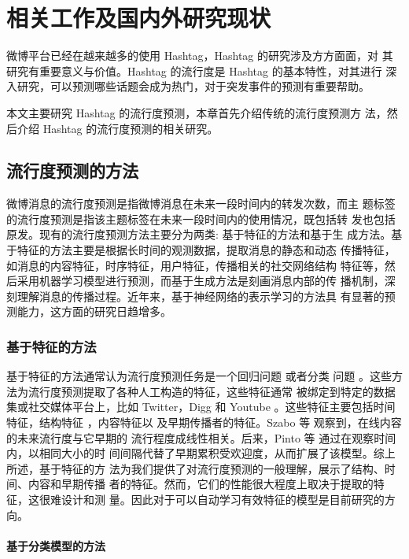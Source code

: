 \chapter{相关工作及国内外研究现状}\label{chap:two}
微博平台已经在越来越多的使用 Hashtag，Hashtag 的研究涉及方方面面，对 其研究有重要意义与价值。Hashtag 的流行度是 Hashtag 的基本特性，对其进行 深入研究，可以预测哪些话题会成为热门，对于突发事件的预测有重要帮助。

本文主要研究 Hashtag 的流行度预测，本章首先介绍传统的流行度预测方 法，然后介绍 Hashtag 的流行度预测的相关研究。

\section{流行度预测的方法}
微博消息的流行度预测是指微博消息在未来一段时间内的转发次数，而主 题标签的流行度预测是指该主题标签在未来一段时间内的使用情况，既包括转 发也包括原发。现有的流行度预测方法主要分为两类: 基于特征的方法和基于生 成方法。基于特征的方法主要是根据长时间的观测数据，提取消息的静态和动态 传播特征，如消息的内容特征，时序特征，用户特征，传播相关的社交网络结构 特征等，然后采用机器学习模型进行预测，而基于生成方法是刻画消息内部的传 播机制，深刻理解消息的传播过程。近年来，基于神经网络的表示学习的方法具 有显著的预测能力，这方面的研究日趋增多。

\subsection{基于特征的方法}
基于特征的方法通常认为流行度预测任务是一个回归问题 \citep{szabo2010predicting,pinto2013using}或者分类 问题 \citep{Cheng2014Can,Shulman2016Predictability}。这些方法为流行度预测提取了各种人工构造的特征，这些特征通常 被绑定到特定的数据集或社交媒体平台上，比如 Twitter\citep{Bakshy2011Everyone}，Digg\citep{szabo2010predicting} 和 Youtube \citep{szabo2010predicting,pinto2013using}。这些特征主要包括时间特征\citep{szabo2010predicting,pinto2013using}，结构特征 \citep{romero2013interplay}，内容特征\citep{tsur2012s}以 及早期传播者的特征。Szabo 等 \citep{szabo2010predicting}观察到，在线内容的未来流行度与它早期的 流行程度成线性相关。后来，Pinto 等 \citep{pinto2013using}通过在观察时间内，以相同大小的时 间间隔代替了早期累积受欢迎度，从而扩展了该模型。综上所述，基于特征的方 法为我们提供了对流行度预测的一般理解，展示了结构、时间、内容和早期传播 者的特征。然而，它们的性能很大程度上取决于提取的特征，这很难设计和测 量。因此对于可以自动学习有效特征的模型是目前研究的方向。


\subsubsection{基于分类模型的方法}

